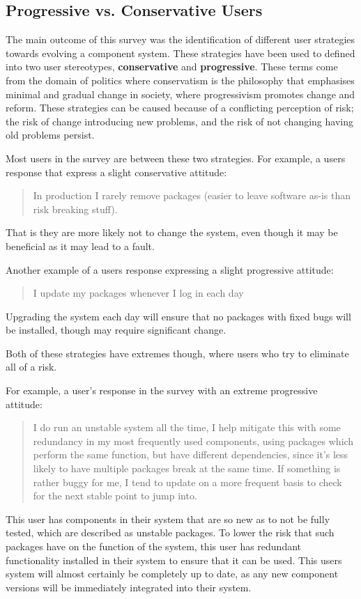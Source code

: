 \subsection{Progressive vs. Conservative Users}
The main outcome of this survey was the identification of different user strategies towards evolving a component system.
These strategies have been used to defined into two user stereotypes, \textbf{conservative} and \textbf{progressive}.
These terms come from the domain of politics where conservatism is the philosophy that emphasises minimal and gradual change in society,
where progressivism promotes change and reform.
These strategies can be caused because of a conflicting perception of risk; the risk of change introducing new problems, and the risk of not changing having old problems persist.

Most users in the survey are between these two strategies. 
For example, a users response that express a slight conservative attitude:
\begin{quotation}
In production I rarely remove packages (easier to leave software as-is than risk breaking stuff).
\end{quotation}
That is they are more likely not to change the system, even though it may be beneficial as it may lead to a fault. 

Another example of a users response expressing a slight progressive attitude:
\begin{quotation}
I update my packages whenever I log in each day
\end{quotation}
Upgrading the system each day will ensure that no packages with fixed bugs will be installed, though may require significant change.

Both of these strategies have extremes though, where users who try to eliminate all of a risk.

For example, a user's response in the survey with an extreme progressive attitude:
\begin{quotation}
I do run an unstable system all the time, I help mitigate this with some redundancy in my most frequently used components, 
using packages which perform the same function, but have different dependencies, since it's less likely to have multiple packages break at the same time. 
If something is rather buggy for me, I tend to update on a more frequent basis to check for the next stable point to jump into.
\end{quotation}
This user has components in their system that are so new as to not be fully tested, which are described as unstable packages.
To lower the risk that such packages have on the function of the system, this user has redundant functionality installed in their system to ensure that it can be used.
This users system will almost certainly be completely up to date, as any new component versions will be immediately integrated into their system.

